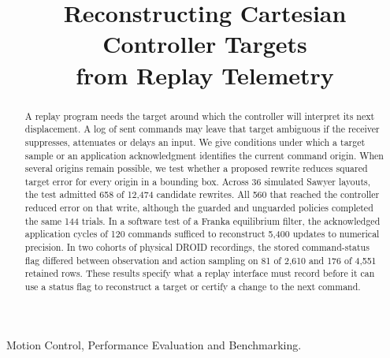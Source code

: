 \documentclass[letterpaper, 10 pt, conference]{ieeeconf}
\title{\LARGE\bf Reconstructing Cartesian Controller Targets\\ from Replay Telemetry}
\author{\phantom{Anonymous Author}}
\begin{document}
\maketitle
\thispagestyle{empty}
\pagestyle{empty}
\begin{abstract}
A replay program needs the target around which the controller will interpret its next displacement. A log of sent commands may leave that target ambiguous if the receiver suppresses, attenuates or delays an input. We give conditions under which a target sample or an application acknowledgment identifies the current command origin. When several origins remain possible, we test whether a proposed rewrite reduces squared target error for every origin in a bounding box. Across 36 simulated Sawyer layouts, the test admitted 658 of 12,474 candidate rewrites. All 560 that reached the controller reduced error on that write, although the guarded and unguarded policies completed the same 144 trials. In a software test of a Franka equilibrium filter, the acknowledged application cycles of 120 commands sufficed to reconstruct 5,400 updates to numerical precision. In two cohorts of physical DROID recordings, the stored command-status flag differed between observation and action sampling on 81 of 2,610 and 176 of 4,551 retained rows. These results specify what a replay interface must record before it can use a status flag to reconstruct a target or certify a change to the next command.
\end{abstract}
\begin{keywords}Motion Control, Performance Evaluation and Benchmarking.\end{keywords}
\end{document}
